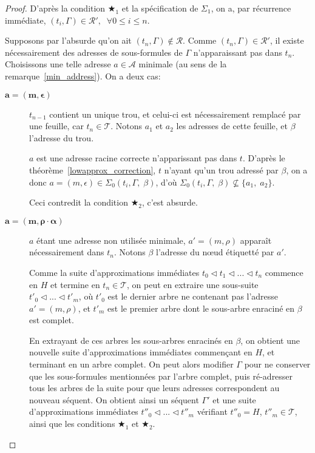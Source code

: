 \documentclass[11pt,a4paper]{article}
\theoremstyle{plain}
\theoremstyle{definition}
\theoremstyle{remark}
\newcommand*{\someadd}{\rho}
\newcommand*{\sequent}{\Gamma}
\newcommand*{\addresses}{\ensuremath{\mathcal{A}}}
\newcommand*{\trees}{\ensuremath{\mathcal{T}}}
\newcommand*{\representations}{\ensuremath{\mathcal{R}}}
\newcommand*{\representationspartial}{\ensuremath{\mathcal{R'}}}
\newcommand*{\relapprox}{\ensuremath{\triangleleft}}
\newcommand*{\lowapprox}{\ensuremath{\Sigma_0}}
\newcommand*{\highapprox}{\ensuremath{\Sigma_1}}
\newcommand*{\exactcond}{\bigstar_1}
\newcommand*{\exactcondbis}{\bigstar_2}
\begin{document}
\begin{proof}
    D'après la condition $\exactcond$ et la spécification de $\highapprox$, on a, par récurrence immédiate, $(t_i, \sequent) \in \representationspartial, \; \; \forall 0 \leq i \leq n$.

    Supposons par l'absurde qu'on ait $(t_n, \sequent) \notin \representations$. Comme $(t_n, \sequent) \in \representationspartial$, il existe nécessairement des adresses de sous-formules de $\sequent$ n'apparaissant pas dans $t_n$. Choisissons une telle adresse $a \in \addresses$ minimale (au sens de la remarque~\ref{min_address}). On a deux cas:

    \begin{description}
        \item[$\bm{a = (m, \epsilon)}$] $t_{n-1}$ contient un unique trou, et celui-ci est nécessairement remplacé par une feuille, car $t_n \in \trees$. Notons $a_1$ et $a_2$ les adresses de cette feuille, et $\beta$ l'adresse du trou.
        
        $a$ est une adresse racine correcte n'apparissant pas dans $t$. D'après le théorème~\ref{lowapprox_correction}, $t$ n'ayant qu'un trou adressé par $\beta$, on a donc $a = (m, \epsilon) \in \lowapprox(t_i, \sequent, \; \beta)$, d'où $\lowapprox(t_i, \sequent, \; \beta) \nsubseteq \{a_1, \; a_2\}$. 
        
        Ceci contredit la condition $\exactcondbis$, c'est absurde.

        \item[$\bm{a = (m, \someadd \cdot \alpha)}$] $a$ étant une adresse non utilisée minimale, $a' = (m, \someadd)$ apparaît nécessairement dans $t_n$. Notons $\beta$ l'adresse du n\oe ud étiquetté par $a'$.

        Comme la suite d'approximations immédiates $t_0 \relapprox t_1 \relapprox ... \relapprox t_n$ commence en $H$ et termine en $t_n \in \trees$, on peut en extraire une sous-suite $t'_0 \relapprox ... \relapprox t'_m$, où $t'_0$ est le dernier arbre ne contenant pas l'adresse $a' = (m, \someadd)$, et $t'_m$ est le premier arbre dont le sous-arbre enraciné en $\beta$ est complet.

        En extrayant de ces arbres les sous-arbres enracinés en $\beta$, on obtient une nouvelle suite d'approximations immédiates commençant en $H$, et terminant en un arbre complet. On peut alors modifier $\sequent$ pour ne conserver que les sous-formules mentionnées par l'arbre complet, puis ré-adresser tous les arbres de la suite pour que leurs adresses correspondent au nouveau séquent. On obtient ainsi un séquent $\sequent'$ et une suite d'approximations immédiates $t''_0 \relapprox ... \relapprox t''_m$ vérifiant $t''_0 = H$, $t''_m \in \trees$, ainsi que les conditions $\exactcond$ et $\exactcondbis$.


\end{description}
\end{proof}
\end{document}
